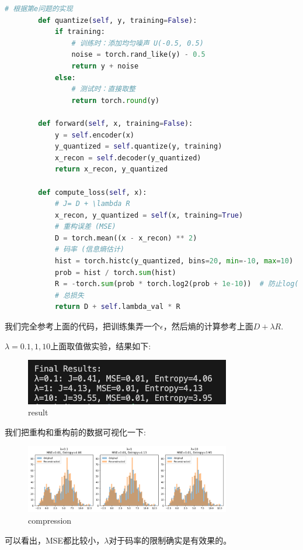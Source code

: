 \documentclass[answers]{exam}  %
\begin{document}
\begin{enumerate}[label=\alph*.]
\begin{lstlisting}[language=python]
        # 根据第e问题的实现
        def quantize(self, y, training=False):
            if training:
                # 训练时：添加均匀噪声 U(-0.5, 0.5)
                noise = torch.rand_like(y) - 0.5
                return y + noise
            else:
                # 测试时：直接取整
                return torch.round(y)
        
        def forward(self, x, training=False):
            y = self.encoder(x)
            y_quantized = self.quantize(y, training)  
            x_recon = self.decoder(y_quantized)
            return x_recon, y_quantized
        
        def compute_loss(self, x):
            # J= D + \lambda R
            x_recon, y_quantized = self(x, training=True)
            # 重构误差 (MSE)
            D = torch.mean((x - x_recon) ** 2)
            # 码率 (信息熵估计)
            hist = torch.histc(y_quantized, bins=20, min=-10, max=10)
            prob = hist / torch.sum(hist)
            R = -torch.sum(prob * torch.log2(prob + 1e-10))  # 防止log(0)
            # 总损失
            return D + self.lambda_val * R
    \end{lstlisting}
    我们完全参考上面的代码，把训练集弄一个$\epsilon$，然后熵的计算参考上面$D +\lambda R$.
    \par $\lambda = 0.1, 1, 10$上面取值做实验，结果如下:
    \begin{figure}[ht]
        \centering
        \label{result}
        \includegraphics[width=0.8\textwidth]{result.png} 
        \caption{result}  
    \end{figure}
    我们把重构和重构前的数据可视化一下:
    \begin{figure}[ht]
        \centering
        \label{compression}
        \includegraphics[width=0.8\textwidth]{compression_results.png} 
        \caption{compression}  
    \end{figure}
    可以看出，MSE都比较小，$\lambda$对于码率的限制确实是有效果的。
\end{enumerate}
\end{document}

